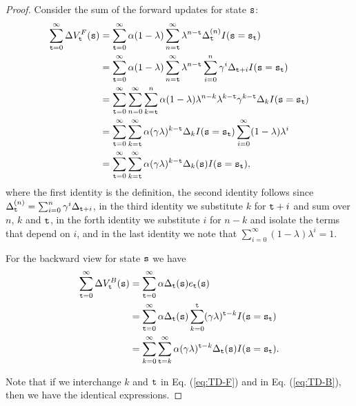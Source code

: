 \begin{proof}
Consider the sum of the forward updates for state ${\tt s}$:
\begin{align}
\sum_{\ttime=0}^{\infty } \Delta V^F_\ttime (\state)&=
\sum_{\ttime=0}^{\infty} \alpha
(1-\lambda) \sum_{n=\ttime}^{\infty} \lambda^{n-\ttime}\Delta_\ttime^{(n)} I(\state=\state_\ttime)\nonumber\\
%
&= \sum_{\ttime=0}^{\infty}  \alpha
(1-\lambda) \sum_{n=\ttime}^{\infty} \lambda^{n-\ttime}\sum_{i=0}^n \discount^i \Delta_{\ttime+i} I(\state=\state_\ttime)\nonumber\\
%
&=\sum_{\ttime=0}^\infty \sum_{n=0}^\infty \sum_{k=\ttime}^n \alpha
(1-\lambda)
\lambda^{n-k}\lambda^{k-\ttime}\discount^{k-\ttime}\Delta_k I(\state=\state_\ttime)\nonumber\\
%
&=\sum_{\ttime=0}^\infty \sum_{k=\ttime}^\infty \alpha
(\discount\lambda)^{k-\ttime}\Delta_k I(\state=\state_\ttime) \sum_{i=0}^\infty (1-\lambda)\lambda^{i}\nonumber\\
%
&= \sum_{\ttime=0}^\infty \sum_{k=\ttime}^\infty \alpha
(\discount\lambda)^{k-\ttime} \Delta_k(\state)
I(\state=\state_\ttime), 
\label{eq:TD-F}
\end{align}
where the first identity is the definition, the second identity
follows since $\Delta_{\tt t}^{(n)}=\sum_{i=0}^n\gamma^i
\Delta_{{\tt t}+i}$, in the third identity we substitute $k$ for
${\tt t}+i$ and sum over $n$, $k$ and ${\tt t}$, in the forth identity we
substitute $i$ for $n-k$ and isolate the terms that depend on $i$,
and in the last identity we note that $\sum_{i=0}^\infty
(1-\lambda)\lambda^{i}=1$.

For the backward view for state ${\tt s}$ we have
\begin{align}
\sum_{{\tt t}=0}^{\infty } \Delta V^B_{\tt t} ({\tt s})&=\sum_{{\tt t}=0}^{\infty} \alpha
\Delta_{\tt t}({\tt s}) e_{{\tt t}}({\tt s})\\
&=\sum_{{\tt t}=0}^{\infty} \alpha
\Delta_{\tt t}({\tt s}) \sum_{k=0}^{\tt t} (\gamma\lambda)^{{\tt t}-k} I({\tt s}={\tt s}_{\tt t})\nonumber\\
&= \sum_{k=0}^\infty \sum_{{\tt t}=k}^\infty \alpha
(\gamma\lambda)^{{\tt t}-k}\Delta_{\tt t}({\tt s})I({\tt s}={\tt s}_{\tt t}).
\label{eq:TD-B}
\end{align}

Note that if we interchange $k$ and ${\tt t}$ in Eq. (\ref{eq:TD-F})
and in Eq. (\ref{eq:TD-B}), then we have the identical expressions.
\end{proof}

